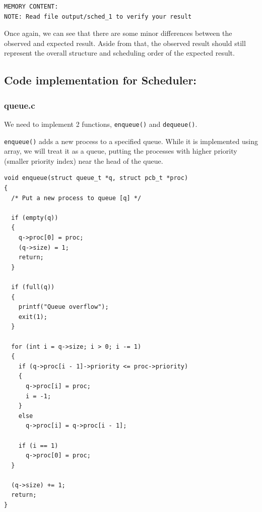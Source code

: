 \documentclass[a4paper]{article}
\numberwithin{equation}{section}
\begin{document}
\begin{mdframed}[leftline=false,rightline=false,backgroundcolor=teal!10,nobreak=false]
\begin{verbatim}
MEMORY CONTENT:
NOTE: Read file output/sched_1 to verify your result
  \end{verbatim}
\end{mdframed}

Once again, we can see that there are some minor differences between the observed and expected result.
Aside from that, the observed result should still represent the overall structure and scheduling order of the expected result.

\subsection{Code implementation for Scheduler:}
\subsubsection{queue.c}
We need to implement 2 functions, \texttt{enqueue()} and \texttt{dequeue()}.

\texttt{enqueue()} adds a new process to a specified queue.
While it is implemented using array, we will treat it as a queue, putting the processes with higher priority (smaller priority index) near the head of the queue.
\begin{mdframed}[leftline=false,rightline=false,backgroundcolor=magenta!10,nobreak=false]
  \begin{verbatim}
void enqueue(struct queue_t *q, struct pcb_t *proc)
{
  /* Put a new process to queue [q] */

  if (empty(q))
  {
    q->proc[0] = proc;
    (q->size) = 1;
    return;
  }

  if (full(q))
  {
    printf("Queue overflow");
    exit(1);
  }

  for (int i = q->size; i > 0; i -= 1)
  {
    if (q->proc[i - 1]->priority <= proc->priority)
    {
      q->proc[i] = proc;
      i = -1;
    }
    else
      q->proc[i] = q->proc[i - 1];

    if (i == 1)
      q->proc[0] = proc;
  }

  (q->size) += 1;
  return;
}
  \end{verbatim}
\end{mdframed}
\end{document}
